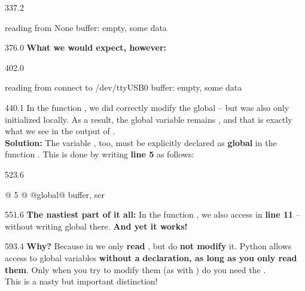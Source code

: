 \documentclass{aslab}
\newcommand*\codex[1]{\fontsize{10bp}{#1bp}\ttfamily\lineskiplimit=-\maxdimen}
\begin{document}
\begin{region}[x=74.7,right=0,pitch=12.1]{337.2}
\begin{codeblock}[basicstyle=\codex{12.1}]
reading from None
buffer: empty, some data
\end{codeblock}
\end{region}

\begin{region}[x=74.7,right=0]{376.0}
\textbf{What we would expect, however:}
\end{region}

\begin{region}[x=74.7,right=0,pitch=12.1]{402.0}
\begin{codeblock}[basicstyle=\codex{12.1}]
reading from connect to /dev/ttyUSB0
buffer: empty, some data
\end{codeblock}
\end{region}

\begin{region}[x=74.7,right=0,pitch=13.85]{440.1}
In the function , we did correctly modify the global
 -- but  was also only initialized locally. As a
result, the global variable  remains , and that is
exactly what we see in the output of .\\
\textbf{Solution:} The variable , too, must be explicitly declared
as \textbf{global} in the function . This is done by writing
\textbf{line 5} as follows:
\end{region}

\begin{region}[x=74.7,right=0]{523.6}
\begin{codeblock}[style=py,basicstyle=\codex{12}]
@ 5 @    @global@ buffer, ser
\end{codeblock}
\end{region}

\begin{region}[x=74.7,right=0,pitch=14.3]{551.6}
\textbf{The nastiest part of it all:} In the function , we
also access  in \textbf{line 11} -- without writing global
 there. \textbf{And yet it works!}
\end{region}

\begin{region}[x=74.7,right=0,pitch=13.7]{593.4}
\textbf{Why?} Because in  we only \textbf{read} ,
but do \textbf{not modify} it. Python allows access to global variables
\textbf{without a} \textbf{ declaration, as long as you only
read them}. Only when you try to modify them (as with
) do you need the .\\
This is a nasty but important distinction!
\end{region}
\end{document}
